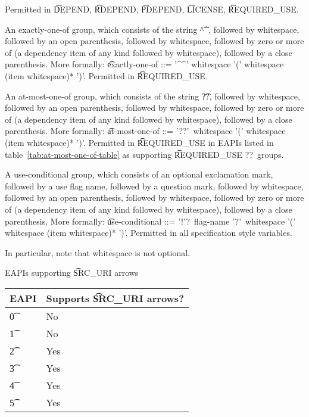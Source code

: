 \begin{compactitem}
    Permitted in \t{DEPEND}, \t{RDEPEND}, \t{PDEPEND}, \t{LICENSE}, \t{REQUIRED\_USE}.
\item An exactly-one-of group, which consists of the string \t{\textasciicircum\textasciicircum},
    followed by whitespace, followed by an open parenthesis, followed by whitespace, followed by
    zero or more of (a dependency item of any kind followed by whitespace), followed by a close
    parenthesis. More formally: \t{exactly-one-of ::= '\textasciicircum\textasciicircum' whitespace
    '(' whitespace (item whitespace)* ')'}.
    Permitted in \t{REQUIRED\_USE}.
\item {} An at-most-one-of group, which consists of the string \t{??},
    followed by whitespace, followed by an open parenthesis, followed by whitespace, followed by
    zero or more of (a dependency item of any kind followed by whitespace), followed by a close
    parenthesis. More formally: \t{at-most-one-of ::= '??'\ whitespace '(' whitespace (item
    whitespace)* ')'}. Permitted in \t{REQUIRED\_USE} in EAPIs listed in
    table~\ref{tab:at-most-one-of-table} as supporting \t{REQUIRED\_USE ??}\ groups.
\item A use-conditional group, which consists of an optional exclamation mark, followed by
    a use flag name, followed by a question mark, followed by whitespace, followed by
    an open parenthesis, followed by whitespace, followed by zero or more of (a dependency item
    of any kind followed by whitespace), followed by a close parenthesis. More formally:
    \t{use-conditional ::= '!'?\ flag-name '?'\ whitespace '(' whitespace (item whitespace)* ')'}.
    Permitted in all specification style variables.
\end{compactitem}

In particular, note that whitespace is not optional.

\begin{centertable}{EAPIs supporting \t{SRC\_URI} arrows} \label{tab:uri-arrows-table}
    \begin{tabular}{ l l }
        \toprule
        \multicolumn{1}{c}{\textbf{EAPI}} &
        \multicolumn{1}{c}{\textbf{Supports \t{SRC\_URI} arrows?}} \\
        \midrule
    \t{0} & No \\
    \t{1} & No \\
    \t{2} & Yes \\
    \t{3} & Yes \\
    \t{4} & Yes \\
    \t{5} & Yes \\
    \bottomrule
    \end{tabular}
\end{centertable}

